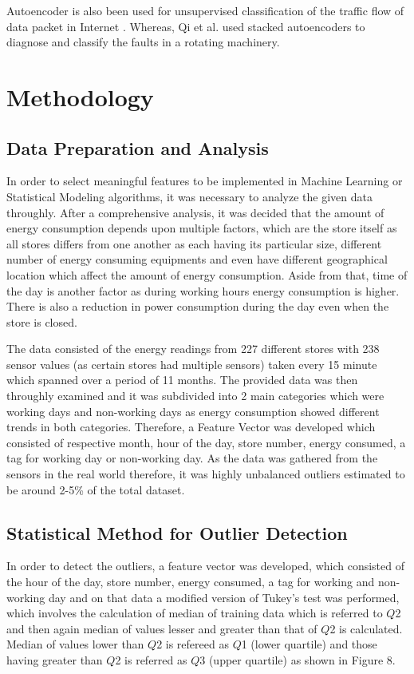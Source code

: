 \documentclass[conference]{IEEEtran}
\begin{document}
Autoencoder is also been used for unsupervised classification of the traffic flow of data packet in Internet \cite{bb27}.
Whereas, Qi et al. \cite{bb28} used stacked autoencoders to diagnose and classify the faults in a rotating machinery.







\section{Methodology}

\subsection{\label{sec:level1}	Data Preparation and Analysis}

In order to select meaningful features to be implemented in Machine Learning
or Statistical Modeling algorithms, it was necessary to analyze the given data throughly. After a comprehensive analysis, it was decided that the amount of energy
consumption depends upon multiple factors, which are the store itself as
all stores differs from one another as each having its particular size, different
number of energy consuming equipments and even have different geographical
location which affect the amount of energy consumption. Aside from that,
time of the day is another factor as during working hours energy consumption
is higher. There is also a reduction in power consumption during the day even when the store is closed.

The data consisted of the energy readings from 227 different stores with 238 sensor values (as certain stores had multiple sensors) taken every 15 minute which spanned over a period of 11 months. The provided data was then throughly examined and it was subdivided into 2 main categories which were working days and non-working days as energy consumption showed different trends in both categories. Therefore, a Feature Vector was developed which consisted of respective month, hour of the day, store number, energy consumed, a tag for working day or non-working day. As the data was gathered from the sensors in the real world therefore, it was highly unbalanced  outliers estimated to be around 2-5\% of the total dataset.


\subsection{\label{sec:level2}	Statistical Method for Outlier Detection}
In order to detect the outliers, a feature vector was developed, which consisted of the hour of the day, store number, energy consumed, a tag for working and non-working day and on that data a modified version of Tukey's test \cite{bb31} was performed, which involves the calculation of median of training data which is referred to $\mathit{Q}$2 and then again median of values lesser and greater than that of $\mathit{Q}$2  is calculated. Median of values lower than $\mathit{Q}$2  is refereed as $\mathit{Q}$1  (lower quartile) and those having greater than $\mathit{Q}$2 is referred as $\mathit{Q}$3  (upper quartile) as shown in Figure 8. 
\end{document}
